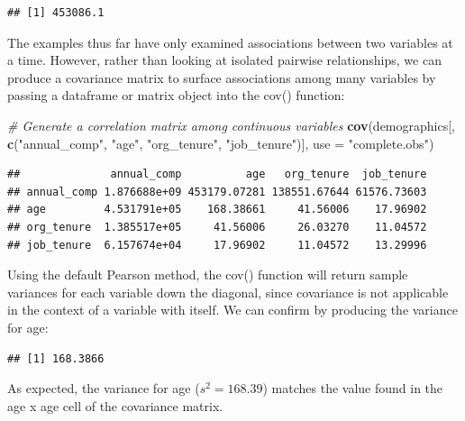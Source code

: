 \documentclass[]{book}
\newenvironment{Shaded}{\begin{snugshade}}{\end{snugshade}}
\newcommand{\CommentTok}[1]{\textcolor[rgb]{0.56,0.35,0.01}{\textit{#1}}}
\newcommand{\DataTypeTok}[1]{\textcolor[rgb]{0.13,0.29,0.53}{#1}}
\newcommand{\KeywordTok}[1]{\textcolor[rgb]{0.13,0.29,0.53}{\textbf{#1}}}
\newcommand{\NormalTok}[1]{#1}
\newcommand{\OperatorTok}[1]{\textcolor[rgb]{0.81,0.36,0.00}{\textbf{#1}}}
\newcommand{\StringTok}[1]{\textcolor[rgb]{0.31,0.60,0.02}{#1}}
\begin{document}
\begin{verbatim}
## [1] 453086.1
\end{verbatim}

The examples thus far have only examined associations between two variables at a time. However, rather than looking at isolated pairwise relationships, we can produce a covariance matrix to surface associations among many variables by passing a dataframe or matrix object into the cov() function:

\begin{Shaded}
\begin{Highlighting}[]
\CommentTok{# Generate a correlation matrix among continuous variables}
\KeywordTok{cov}\NormalTok{(demographics[, }\KeywordTok{c}\NormalTok{(}\StringTok{"annual_comp"}\NormalTok{, }\StringTok{"age"}\NormalTok{, }\StringTok{"org_tenure"}\NormalTok{, }\StringTok{"job_tenure"}\NormalTok{)], }\DataTypeTok{use =} \StringTok{"complete.obs"}\NormalTok{)}
\end{Highlighting}
\end{Shaded}

\begin{verbatim}
##              annual_comp          age   org_tenure  job_tenure
## annual_comp 1.876688e+09 453179.07281 138551.67644 61576.73603
## age         4.531791e+05    168.38661     41.56006    17.96902
## org_tenure  1.385517e+05     41.56006     26.03270    11.04572
## job_tenure  6.157674e+04     17.96902     11.04572    13.29996
\end{verbatim}

Using the default Pearson method, the cov() function will return sample variances for each variable down the diagonal, since covariance is not applicable in the context of a variable with itself. We can confirm by producing the variance for age:

\begin{Shaded}
\end{Shaded}

\begin{verbatim}
## [1] 168.3866
\end{verbatim}

As expected, the variance for age (\(s^{2} = 168.39\)) matches the value found in the age x age cell of the covariance matrix.
\end{document}
